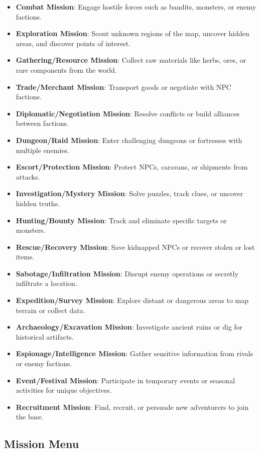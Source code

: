 \begin{itemize}[noitemsep, topsep=0pt]
    \item \textbf{Combat Mission}: Engage hostile forces such as bandits, monsters, or enemy factions.
    \item \textbf{Exploration Mission}: Scout unknown regions of the map, uncover hidden areas, and discover points of interest.
    \item \textbf{Gathering/Resource Mission}: Collect raw materials like herbs, ores, or rare components from the world.
    \item \textbf{Trade/Merchant Mission}: Transport goods or negotiate with NPC factions.
    \item \textbf{Diplomatic/Negotiation Mission}: Resolve conflicts or build alliances between factions.
    \item \textbf{Dungeon/Raid Mission}: Enter challenging dungeons or fortresses with multiple enemies.
    \item \textbf{Escort/Protection Mission}: Protect NPCs, caravans, or shipments from attacks.
    \item \textbf{Investigation/Mystery Mission}: Solve puzzles, track clues, or uncover hidden truths. 
    \item \textbf{Hunting/Bounty Mission}: Track and eliminate specific targets or monsters.
    \item \textbf{Rescue/Recovery Mission}: Save kidnapped NPCs or recover stolen or lost items.
    \item \textbf{Sabotage/Infiltration Mission}: Disrupt enemy operations or secretly infiltrate a location.
	\item \textbf{Expedition/Survey Mission}: Explore distant or dangerous areas to map terrain or collect data.
	\item \textbf{Archaeology/Excavation Mission}: Investigate ancient ruins or dig for historical artifacts.
	\item \textbf{Espionage/Intelligence Mission}: Gather sensitive information from rivals or enemy factions.
	\item \textbf{Event/Festival Mission}: Participate in temporary events or seasonal activities for unique objectives.
    \item \textbf{Recruitment Mission}: Find, recruit, or persuade new adventurers to join the base.
\end{itemize}

\subsection{Mission Menu}

